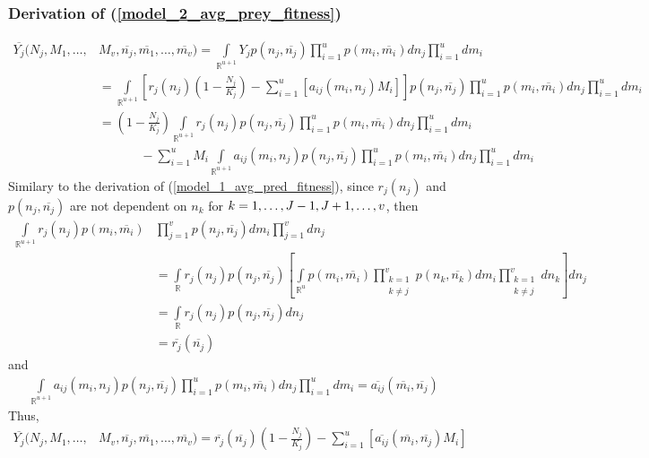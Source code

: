 \documentclass{amsart}
\theoremstyle{definition}
\theoremstyle{remark}
\numberwithin{equation}{section}
\begin{document}
\subsubsection{Derivation of (\ref{model_2_avg_prey_fitness})}
\begin{align*}
	\overline{Y_j}(N_j, M_1, \dots, &M_v, \overline{n_j}, \overline{m_1}, \dots, \overline{m_v}) = \int\limits_{\mathbb{R}^{u+1}}^{}Y_jp(n_j, \overline{n_j})\prod\limits_{i = 1}^{u}p(m_i, \overline{m_i})dn_j\prod\limits_{i = 1}^{u}dm_i \\
	&= \int\limits_{\mathbb{R}^{u+1}}\left[r_j(n_j)\left(1 - \frac{N_j}{K_j}\right) - \sum\limits_{i = 1}^{u}\left[a_{ij}(m_i, n_j)M_i\right]\right]p(n_j, \overline{n_j})\prod\limits_{i = 1}^{u}p(m_i, \overline{m_i})dn_j\prod\limits_{i = 1}^{u}dm_i \\
	&= \left(1 - \frac{N_j}{K_j}\right)\int\limits_{\mathbb{R}^{u+1}}r_j(n_j)p(n_j, \overline{n_j})\prod\limits_{i = 1}^{u}p(m_i, \overline{m_i})dn_j\prod\limits_{i = 1}^{u}dm_i \\
	&\ \ \ \ \ \ \ \ \ \ \ \ \ \ \ - \sum\limits_{i=1}^{u}M_i\int\limits_{\mathbb{R}^{u+1}}a_{ij}(m_i, n_j)p(n_j, \overline{n_j})\prod\limits_{i = 1}^{u}p(m_i, \overline{m_i})dn_j\prod\limits_{i = 1}^{u}dm_i
\end{align*}
Similary to the derivation of (\ref{model_1_avg_pred_fitness}), since $r_j(n_j)$ and $p(n_j, \overline{n_j})$ are not dependent on $n_k$ for $k = 1, \dots, J-1, J+1, \dots, v$, then 
\begin{align*}
	\int\limits_{\mathbb{R}^{u+1}}^{}r_j(n_j)p(m_i, \overline{m_i})&\prod\limits_{j = 1}^{v}p(n_j, \overline{n_j})dm_i\prod\limits_{j = 1}^{v}dn_j \\
	&= \int\limits_{\mathbb{R}}r_j(n_j)p(n_j, \overline{n_j})\left[\int\limits_{\mathbb{R}^{u}}p(m_i, \overline{m_i})\prod\limits_{\substack{k=1\\k\neq j}}^{v}p(n_k, \overline{n_k})dm_i\prod\limits_{\substack{k=1\\k\neq j}}^{v}dn_k\right]dn_j \\
	&= \int\limits_{\mathbb{R}}r_j(n_j)p(n_j, \overline{n_j})dn_j \\
	&= \overline{r_j}(\overline{n_j})
\end{align*}
and
\begin{align*}
	\int\limits_{\mathbb{R}^{u+1}}a_{ij}(m_i, n_j)p(n_j, \overline{n_j})\prod\limits_{i = 1}^{u}p(m_i, \overline{m_i})dn_j\prod\limits_{i = 1}^{u}dm_i = \overline{a_{ij}}(\overline{m_i}, \overline{n_j})
\end{align*}
Thus,
\begin{align*}
	\overline{Y_j}(N_j, M_1, \dots, &M_v, \overline{n_j}, \overline{m_1}, \dots, \overline{m_v}) = \overline{r_j}(\overline{n_j})\left(1 - \frac{N_j}{K_j}\right) - \sum\limits_{i = 1}^{u}\left[\overline{a_{ij}}(\overline{m_i}, \overline{n_j})M_i\right]
\end{align*}
\end{document}
